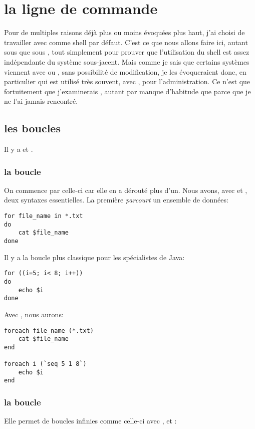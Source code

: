 
\section{la ligne de commande}
Pour de multiples raisons déjà plus ou moins évoquées plus haut, j'ai choisi de travailler avec \zsh{} comme shell par défaut. C'est ce que nous allons faire ici, autant sous \freebsd{} que sous \linux{}, tout simplement pour prouver que l'utilisation du shell est assez indépendante du système sous-jacent. Mais comme je sais que certains systèmes viennent avec \bash{} ou \tcsh{}, sans possibilité de modification, je les évoqueraient donc, en particulier \tcsh{} qui est utilisé très souvent, avec \csh{}, pour l'administration. Ce n'est que fortuitement que j'examinerais \ksh{},  autant par manque d'habitude que parce que je ne l'ai jamais rencontré.

\subsection{les boucles}
Il y a  et .

\subsubsection{la boucle }
On commence par celle-ci car elle en a dérouté plus d'un. Nous avons, avec \zsh{} et \bash, deux syntaxes essentielles. La première \emph{parcourt} un ensemble de données:

\begin{lstlisting}
for file_name in *.txt
do
	cat $file_name
done
\end{lstlisting}

Il y a la boucle plus classique pour les spécialistes de Java:

\begin{lstlisting}
for ((i=5; i< 8; i++))
do
	echo $i
done
\end{lstlisting}

Avec \tcsh{}, nous aurons:

\begin{lstlisting}
foreach file_name (*.txt)
	cat $file_name
end

foreach i (`seq 5 1 8`)
	echo $i
end
\end{lstlisting}


\subsubsection{la boucle }
Elle permet de boucles infinies comme celle-ci avec \zsh{}, \bash{} et \ksh{}:


